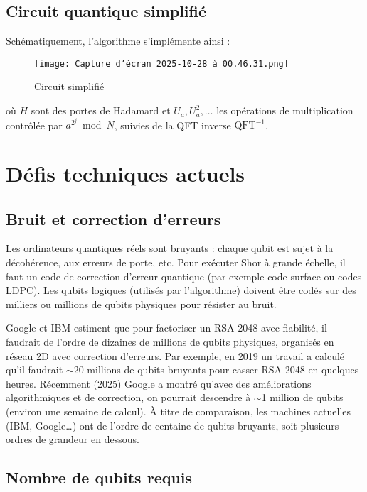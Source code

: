 \documentclass[11pt,a4paper]{article}
\begin{document}
\subsection{Circuit quantique simplifié}

Schématiquement, l'algorithme s'implémente ainsi :

\begin{figure}[h]
    \centering
    \texttt{[image: Capture d’écran 2025-10-28 à 00.46.31.png]}
    \caption{Circuit simplifié}
\end{figure}




où $H$ sont des portes de Hadamard et $U_a, U_a^2, \ldots$ les opérations de multiplication contrôlée par $a^{2^j} \bmod N$, suivies de la QFT inverse $\text{QFT}^{-1}$.

\section{Défis techniques actuels}

\subsection{Bruit et correction d'erreurs}

Les ordinateurs quantiques réels sont bruyants : chaque qubit est sujet à la décohérence, aux erreurs de porte, etc. Pour exécuter Shor à grande échelle, il faut un code de correction d'erreur quantique (par exemple code surface ou codes LDPC). Les qubits logiques (utilisés par l'algorithme) doivent être codés sur des milliers ou millions de qubits physiques pour résister au bruit.

Google et IBM estiment que pour factoriser un RSA-2048 avec fiabilité, il faudrait de l'ordre de dizaines de millions de qubits physiques, organisés en réseau 2D avec correction d'erreurs. Par exemple, en 2019 un travail a calculé qu'il faudrait $\sim$20 millions de qubits bruyants pour casser RSA-2048 en quelques heures. Récemment (2025) Google a montré qu'avec des améliorations algorithmiques et de correction, on pourrait descendre à $\sim$1 million de qubits (environ une semaine de calcul). À titre de comparaison, les machines actuelles (IBM, Google…) ont de l'ordre de centaine de qubits bruyants, soit plusieurs ordres de grandeur en dessous.

\subsection{Nombre de qubits requis}
\end{document}
